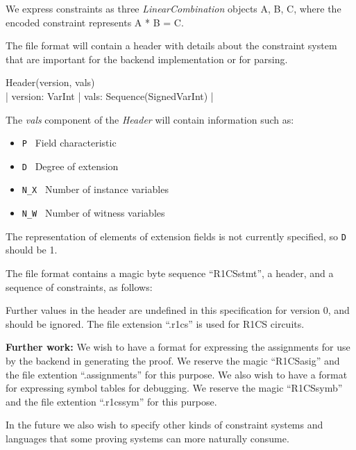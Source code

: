 We express constraints as three \emph{LinearCombination} objects A, B, C, where the encoded constraint represents A * B = C.

The file format will contain a header with details about the constraint system that are important for the backend implementation or for parsing.

{\ttfamily
Header(version, vals) \shortleftarrow\\
| version: VarInt | vals: Sequence(SignedVarInt) |
}

The \emph{vals} component of the \emph{Header} will contain information such as:
\begin{itemize}
  \item  {\tt P} \shortleftarrow\ Field characteristic
  \item  {\tt D} \shortleftarrow\ Degree of extension
  \item  {\tt N\_X} \shortleftarrow\ Number of instance variables
  \item  {\tt N\_W} \shortleftarrow\ Number of witness variables
\end{itemize}

The representation of elements of extension fields is not currently specified, so {\tt D} should be 1.

The file format contains a magic byte sequence  ``R1CSstmt'', a header, and a sequence of constraints, as follows:


Further values in the header are undefined in this specification for version 0, and should be ignored. The file extension ``.r1cs'' is used for R1CS circuits.

\textbf{Further work:} We wish to have a format for expressing the assignments for use by the backend in generating the proof. We reserve the magic ``R1CSasig'' and the file extention ``.assignments'' for this purpose. We also wish to have a format for expressing symbol tables for debugging. We reserve the magic ``R1CSsymb'' and the file extention ``.r1cssym'' for this purpose.

In the future we also wish to specify other kinds of constraint systems and languages that some proving systems can more naturally consume.
